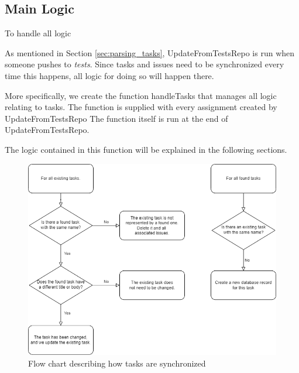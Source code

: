 \subsection{Main Logic}

To handle all logic

As mentioned in Section \ref{sec:parsing_tasks}, UpdateFromTestsRepo is run when someone pushes to \textit{tests}.
Since tasks and issues need to be synchronized every time this happens, all logic for doing so will happen there.

More specifically, we create the function handleTasks that manages all logic relating to tasks.
The function is supplied with every assignment created by UpdateFromTestsRepo
The function itself is run at the end of UpdateFromTestsRepo.



The logic contained in this function will be explained in the following sections.

\begin{figure}[ht]
    \centering
    \includegraphics[width=\textwidth]{photos/synchronize-tasks-flow-chart.png}
    \caption{Flow chart describing how tasks are synchronized}
    \label{fig:synchronize-tasks-flow-chart}
\end{figure}